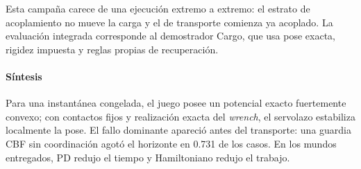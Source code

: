 Esta campaña carece de una ejecución extremo a extremo: el estrato de acoplamiento no mueve la carga y el de transporte comienza ya acoplado. La evaluación integrada corresponde al demostrador Cargo, que usa pose exacta, rigidez impuesta y reglas propias de recuperación.

\paragraph{Síntesis}

Para una instantánea congelada, el juego posee un potencial exacto fuertemente convexo; con contactos fijos y realización exacta del \emph{wrench}, el servolazo estabiliza localmente la pose. El fallo dominante apareció antes del transporte: una guardia CBF sin coordinación agotó el horizonte en 0.731 de los casos. En los mundos entregados, PD redujo el tiempo y Hamiltoniano redujo el trabajo.

